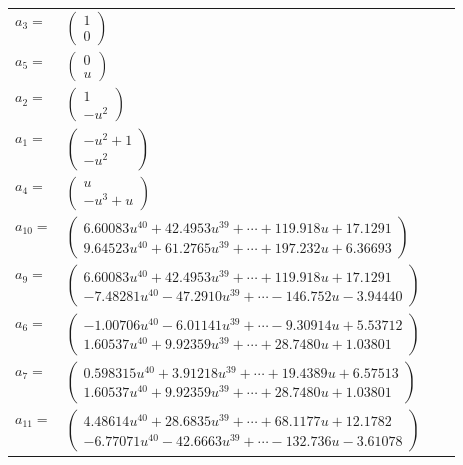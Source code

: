 \documentclass[1p]{elsarticle_modified}
\theoremstyle{definition}
\begin{document}
\begin{tabular}{m{7pt} m{180pt} m{7pt} m{180pt} }
\flushright $a_{3}=$&$\begin{pmatrix}1\\0\end{pmatrix}$ \\
\flushright $a_{5}=$&$\begin{pmatrix}0\\u\end{pmatrix}$ \\
\flushright $a_{2}=$&$\begin{pmatrix}1\\- u^2\end{pmatrix}$ \\
\flushright $a_{1}=$&$\begin{pmatrix}- u^2+1\\- u^2\end{pmatrix}$ \\
\flushright $a_{4}=$&$\begin{pmatrix}u\\- u^3+u\end{pmatrix}$ \\
\flushright $a_{10}=$&$\begin{pmatrix}6.60083 u^{40}+42.4953 u^{39}+\cdots+119.918 u+17.1291\\9.64523 u^{40}+61.2765 u^{39}+\cdots+197.232 u+6.36693\end{pmatrix}$ \\
\flushright $a_{9}=$&$\begin{pmatrix}6.60083 u^{40}+42.4953 u^{39}+\cdots+119.918 u+17.1291\\-7.48281 u^{40}-47.2910 u^{39}+\cdots-146.752 u-3.94440\end{pmatrix}$ \\
\flushright $a_{6}=$&$\begin{pmatrix}-1.00706 u^{40}-6.01141 u^{39}+\cdots-9.30914 u+5.53712\\1.60537 u^{40}+9.92359 u^{39}+\cdots+28.7480 u+1.03801\end{pmatrix}$ \\
\flushright $a_{7}=$&$\begin{pmatrix}0.598315 u^{40}+3.91218 u^{39}+\cdots+19.4389 u+6.57513\\1.60537 u^{40}+9.92359 u^{39}+\cdots+28.7480 u+1.03801\end{pmatrix}$ \\
\flushright $a_{11}=$&$\begin{pmatrix}4.48614 u^{40}+28.6835 u^{39}+\cdots+68.1177 u+12.1782\\-6.77071 u^{40}-42.6663 u^{39}+\cdots-132.736 u-3.61078\end{pmatrix}$ \\

\end{tabular}
\end{document}
